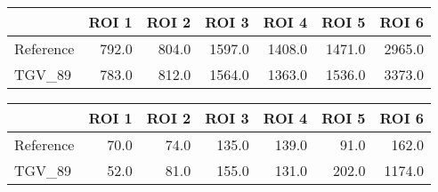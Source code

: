 \begin{tabular}{lrrrrrr}
\toprule
{} &  ROI 1 &  ROI 2 &   ROI 3 &   ROI 4 &   ROI 5 &   ROI 6 \\
\midrule
Reference &  792.0 &  804.0 &  1597.0 &  1408.0 &  1471.0 &  2965.0 \\
TGV\_89    &  783.0 &  812.0 &  1564.0 &  1363.0 &  1536.0 &  3373.0 \\
\bottomrule
\end{tabular}
\begin{tabular}{lrrrrrr}
\toprule
{} &  ROI 1 &  ROI 2 &  ROI 3 &  ROI 4 &  ROI 5 &   ROI 6 \\
\midrule
Reference &   70.0 &   74.0 &  135.0 &  139.0 &   91.0 &   162.0 \\
TGV\_89    &   52.0 &   81.0 &  155.0 &  131.0 &  202.0 &  1174.0 \\
\bottomrule
\end{tabular}
